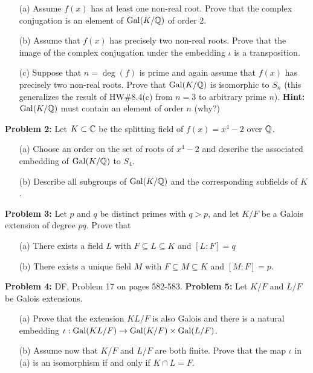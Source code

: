\documentclass[12pt]{amsart}
\begin{document}
\begin{itemize}
\item[(a)] Assume $f(x)$ has at least one non-real root. Prove
that the complex conjugation is an element of ${\rm Gal}(K/{\mathbb Q})$
of order $2$.

\item[(b)] Assume that $f(x)$ has precisely two non-real roots. Prove
that the image of the complex conjugation under the embedding $\iota$
is a transposition.

\item[(c)] Suppose that $n=\deg(f)$ is prime and again assume that $f(x)$ has precisely
two non-real roots. Prove that ${\rm Gal}(K/{\mathbb Q})$ is isomorphic to $S_n$ (this generalizes the result
of HW\#8.4(c) from $n=3$ to arbitrary prime $n$).
{\bf Hint:} ${\rm Gal}(K/{\mathbb Q})$ must contain an element of order $n$ (why?)


\end{itemize}

{\bf Problem 2:} Let $K\subset{\mathbb C}$ be the splitting field of $f(x)=x^4-2$ over ${\mathbb Q}$.

\begin{itemize}
\item[(a)] Choose an order on the set of roots of $x^4-2$ and describe the associated embedding
of ${\rm Gal}(K/{\mathbb Q})$ to $S_4$.

\item[(b)] Describe all subgroups of ${\rm Gal}(K/{\mathbb Q})$ and the corresponding subfields of $K$.

\end{itemize}

\newpage
\skv
{\bf Problem 3:} Let $p$ and $q$ be distinct primes with $q>p$,
and let $K/F$ be a Galois extension of degree $pq$. Prove that
\begin{itemize}
\item[(a)] There exists a field $L$ with $F\subseteq L\subseteq K$ and $[L:F]=q$

\item[(b)] There exists a unique field $M$ with $F\subseteq M\subseteq K$ and $[M:F]=p$.
\end{itemize}
\skv

{\bf Problem 4:} DF, Problem 17 on pages 582-583. 
\skv
{\bf Problem 5:} Let $K/F$ and $L/F$ be Galois extensions.

\begin{itemize}
\item[(a)] Prove that the extension $KL/F$ is also Galois and there is a natural
embedding $\iota:{\rm Gal}(KL/F)\to {\rm Gal}(K/F)\times {\rm Gal}(L/F)$.

\item[(b)]
Assume now that $K/F$ and $L/F$ are both finite. Prove that the map $\iota$ in (a)
is an isomorphism if and only if $K\cap L=F$.
\end{itemize}
\end{document}
